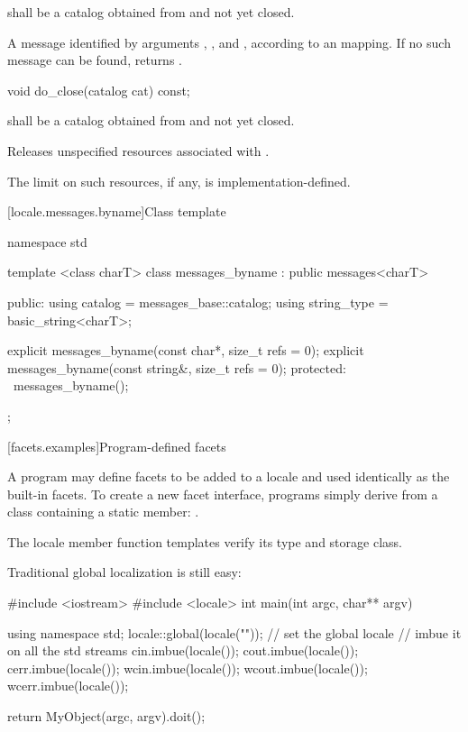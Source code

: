 \begin{itemdescr}
\pnum
\requires
{} shall be a catalog obtained from
and not yet closed.

\pnum
\returns
A message identified by arguments , , and , according
to an  mapping. If no
such message can be found, returns .
\end{itemdescr}

%
\begin{itemdecl}
void do_close(catalog cat) const;
\end{itemdecl}

\begin{itemdescr}
\pnum
\requires
{} shall be a catalog obtained from
and not yet closed.

\pnum
\effects
Releases unspecified resources associated with  .

\pnum
\remarks
The limit on such resources, if any, is implementation-defined.
\end{itemdescr}

[locale.messages.byname]{Class template }

%
\begin{codeblock}
namespace std {
  template <class charT>
  class messages_byname : public messages<charT> {
  public:
    using catalog     = messages_base::catalog;
    using string_type = basic_string<charT>;

    explicit messages_byname(const char*, size_t refs = 0);
    explicit messages_byname(const string&, size_t refs = 0);
  protected:
    ~messages_byname();
  };
}
\end{codeblock}

[facets.examples]{Program-defined facets}

\pnum
A \Cpp program may define facets to be added to a locale and used identically as
the built-in facets.
To create a new facet interface, \Cpp programs simply derive from
a class containing a static member:
.

\pnum
\begin{note}
The locale member function templates verify its type and storage class.
\end{note}

\pnum
\begin{example}
Traditional global localization is still easy:

\begin{codeblock}
#include <iostream>
#include <locale>
int main(int argc, char** argv) {
  using namespace std;
  locale::global(locale(""));           // set the global locale
                                        // imbue it on all the std streams
  cin.imbue(locale());
  cout.imbue(locale());
  cerr.imbue(locale());
  wcin.imbue(locale());
  wcout.imbue(locale());
  wcerr.imbue(locale());

  return MyObject(argc, argv).doit();
}
\end{codeblock}
\end{example}

